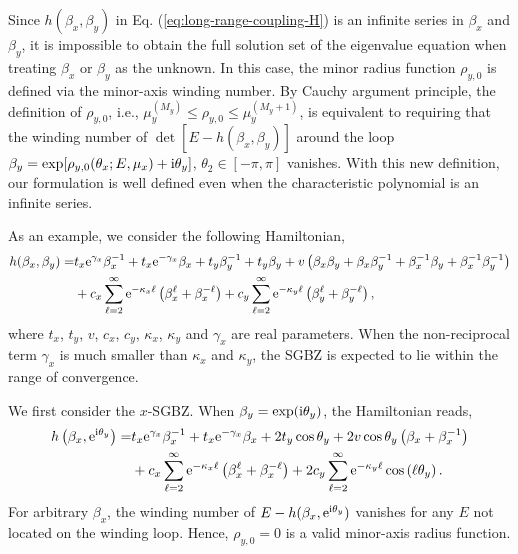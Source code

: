 \documentclass[pdflatex,sn-nature, iicol]{sn-jnl}%
\theoremstyle{thmstyleone}%
\theoremstyle{thmstyletwo}%
\theoremstyle{thmstylethree}%
\begin{document}
Since $h(\beta_{x},\beta_{y})$ in Eq. (\ref{eq:long-range-coupling-H})
is an infinite series in $\beta_{x}$ and $\beta_{y}$, it is impossible
to obtain the full solution set of the eigenvalue equation when treating
$\beta_{x}$ or $\beta_{y}$ as the unknown. In this case, the minor
radius function $\rho_{y,0}$ is defined via the minor-axis winding
number. By Cauchy argument principle, the definition of $\rho_{y,0}$,
i.e., $\mu_{y}^{(M_{y})}\leq\rho_{y,0}\leq\mu_{y}^{(M_{y}+1)}$, is
equivalent to requiring that the winding number of $\det[E-h(\beta_{x},\beta_{y})]$
around the loop $\beta_{y}=\exp[\rho_{y,0}(\theta_{x};E,\mu_{x})+\mathrm{i}\theta_{y}]$,
$\theta_{2}\in[-\pi,\pi]$ vanishes. With this new definition, our
formulation is well defined even when the characteristic polynomial
is an infinite series.

As an example, we consider the following Hamiltonian, 
\begin{align}
h(\beta_{x},\beta_{y})= & t_{x}\mathrm{e}^{\gamma_{x}}\beta_{x}^{-1}+t_{x}\mathrm{e}^{-\gamma_{x}}\beta_{x}+t_{y}\beta_{y}^{-1}+t_{y}\beta_{y}+v\left(\beta_{x}\beta_{y}+\beta_{x}\beta_{y}^{-1}+\beta_{x}^{-1}\beta_{y}+\beta_{x}^{-1}\beta_{y}^{-1}\right)\nonumber \\
 & +c_{x}\sum_{\ell=2}^{\infty}\mathrm{e}^{-\kappa_{x}\ell}\left(\beta_{x}^{\ell}+\beta_{x}^{-\ell}\right)+c_{y}\sum_{\ell=2}^{\infty}\mathrm{e}^{-\kappa_{y}\ell}\left(\beta_{y}^{\ell}+\beta_{y}^{-\ell}\right),\label{eq:long-range-coupling-H}
\end{align}
where $t_{x}$, $t_{y}$, $v$, $c_{x}$, $c_{y}$, $\kappa_{x}$,
$\kappa_{y}$ and $\gamma_{x}$ are real parameters. When the non-reciprocal
term $\gamma_{x}$ is much smaller than $\kappa_{x}$ and $\kappa_{y}$,
the SGBZ is expected to lie within the range of convergence.

We first consider the $x$-SGBZ. When $\beta_{y}=\exp(\mathrm{i}\theta_{y})$,
the Hamiltonian reads, 
\begin{align}
h\left(\beta_{x},\mathrm{e}^{\mathrm{i}\theta_{y}}\right)= & t_{x}\mathrm{e}^{\gamma_{x}}\beta_{x}^{-1}+t_{x}\mathrm{e}^{-\gamma_{x}}\beta_{x}+2t_{y}\cos\theta_{y}+2v\cos\theta_{y}\left(\beta_{x}+\beta_{x}^{-1}\right)\nonumber \\
 & +c_{x}\sum_{\ell=2}^{\infty}\mathrm{e}^{-\kappa_{x}\ell}\left(\beta_{x}^{\ell}+\beta_{x}^{-\ell}\right)+2c_{y}\sum_{\ell=2}^{\infty}\mathrm{e}^{-\kappa_{y}\ell}\cos\left(\ell\theta_{y}\right).
\end{align}
For arbitrary $\beta_{x}$, the winding number of $E-h(\beta_{x},\mathrm{e}^{\mathrm{i}\theta_{y}})$
vanishes for any $E$ not located on the winding loop. Hence, $\rho_{y,0}=0$
is a valid minor-axis radius function.
\end{document}
